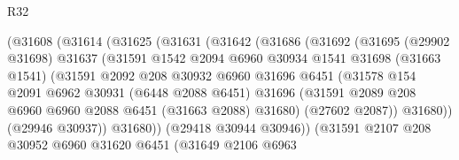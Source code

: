 \begin{lexlean}{R32}
\begin{coremodule}
                      (@31608
                        (@31614
                          (@31625
                            (@31631
                              (@31642
                                (@31686
                                  (@31692
                                    (@31695
                                      (@29902 @31698)
                                      @31637
                                      (@31591
                                        @1542
                                        @2094
                                        @6960
                                        @30934
                                        @1541
                                        @31698
                                        (@31663 @1541)
                                        (@31591
                                          @2092
                                          @208
                                          @30932
                                          @6960
                                          @31696
                                          @6451
                                          (@31578
                                            @154
                                            @2091
                                            @6962
                                            @30931
                                            (@6448 @2088 @6451)
                                            @31696
                                            (@31591
                                              @2089
                                              @208
                                              @6960
                                              @6960
                                              @2088
                                              @6451
                                              (@31663 @2088)
                                              @31680)
                                            (@27602 @2087))
                                          @31680))
                                      (@29946 @30937))
                                    @31680))
                                (@29418 @30944 @30946))
                              (@31591
                                @2107
                                @208
                                @30952
                                @6960
                                @31620
                                @6451
                                (@31649
                                  @2106
                                  @6963

\end{coremodule}
\end{lexlean}
